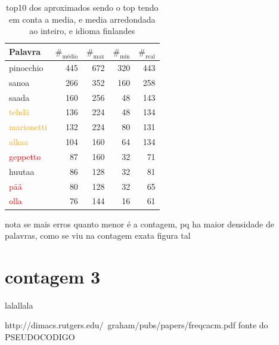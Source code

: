 \documentclass[mirror, portugues]{revdetua}
\begin{document}
\begin{table}[H]
\centering
\caption{top10 dos aproximados sendo o top tendo em conta a media, e media arredondada ao inteiro, e idioma finlandes}
\label{table:top10_aprox_finlandes}
\begin{tabular}{lrrr|r}
\toprule
Palavra & $\text{\#}_{\text{médio}}$ & $\text{\#}_{\text{max}}$ & $\text{\#}_{\text{min}}$ & $\text{\#}_{\text{real}}$ \\
\midrule
pinocchio & 445 & 672 & 320 & 443\\
sanoa & 266 & 352 & 160 & 258 \\
saada & 160 & 256 & 48 & 143 \\
\textcolor{orange}{tehdä} & 136 & 224 & 48 & 134 \\
\textcolor{orange}{marionetti} & 132 & 224 & 80 & 131 \\
\textcolor{orange}{alkaa} & 104 & 160 & 64 & 134 \\
\textcolor{red}{geppetto} & 87 & 160 & 32 & 71 \\
huutaa & 86 & 128 & 32 & 81 \\
\textcolor{red}{pää} & 80 & 128 & 32 & 65 \\
\textcolor{red}{olla} & 76 & 144 & 16 & 61 \\
\bottomrule
\end{tabular}
\end{table}

nota se mais erros quanto menor é a contagem, pq ha maior densidade de palavras, como se viu na contagem exata figura tal


\section{contagem 3}

lalallala


http://dimacs.rutgers.edu/~graham/pubs/papers/freqcacm.pdf fonte do PSEUDOCODIGO
\end{document}
